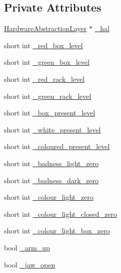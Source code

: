 \subsection*{Private Attributes}
\begin{DoxyCompactItemize}
\item 
\hyperlink{classIDP_1_1HardwareAbstractionLayer}{HardwareAbstractionLayer} $\ast$ \hyperlink{classIDP_1_1ClampControl_ac0c31fdbef30bc0c0d729843c8874475}{\_\-hal}
\item 
short int \hyperlink{classIDP_1_1ClampControl_ad6188d015d2f9f237abc81574715f6f6}{\_\-red\_\-box\_\-level}
\item 
short int \hyperlink{classIDP_1_1ClampControl_a4525ba276d66d2d29a8f1feb956bb769}{\_\-green\_\-box\_\-level}
\item 
short int \hyperlink{classIDP_1_1ClampControl_ac9d8d3c77082aa750ddb98b32596f636}{\_\-red\_\-rack\_\-level}
\item 
short int \hyperlink{classIDP_1_1ClampControl_af6424de6982b37b9aab8d190b06d51be}{\_\-green\_\-rack\_\-level}
\item 
short int \hyperlink{classIDP_1_1ClampControl_a486cebcf52979b03361cce9ecb84f2e3}{\_\-box\_\-present\_\-level}
\item 
short int \hyperlink{classIDP_1_1ClampControl_a1576dda5ebbae90e0861fa0212e5d743}{\_\-white\_\-present\_\-level}
\item 
short int \hyperlink{classIDP_1_1ClampControl_ab9e34e39d14e415e3a9b938451fe70a6}{\_\-coloured\_\-present\_\-level}
\item 
short int \hyperlink{classIDP_1_1ClampControl_a1391b175b26be6760be280f8e1b8bd4c}{\_\-badness\_\-light\_\-zero}
\item 
short int \hyperlink{classIDP_1_1ClampControl_aa17b2cb9431db23053f27a0955d26548}{\_\-badness\_\-dark\_\-zero}
\item 
short int \hyperlink{classIDP_1_1ClampControl_aa8dfb019900ee99b77e3eeb227d4de18}{\_\-colour\_\-light\_\-zero}
\item 
short int \hyperlink{classIDP_1_1ClampControl_a7639828ac6b5d83131718412b3dd5ca2}{\_\-colour\_\-light\_\-closed\_\-zero}
\item 
short int \hyperlink{classIDP_1_1ClampControl_acca5d1d3e3e3fc8b148a4889c76b0dc2}{\_\-colour\_\-light\_\-box\_\-zero}
\item 
bool \hyperlink{classIDP_1_1ClampControl_aa5103702b2e1a040a90bdb8199ff0e8b}{\_\-arm\_\-up}
\item 
bool \hyperlink{classIDP_1_1ClampControl_a07bfb23f284fb25dacd0d22e5f218375}{\_\-jaw\_\-open}
\end{DoxyCompactItemize}


